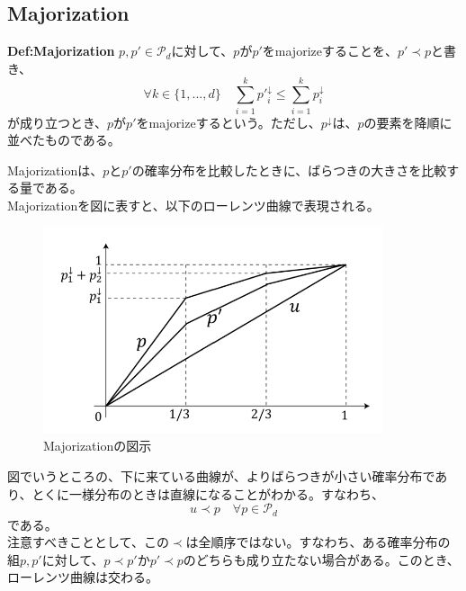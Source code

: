 \documentclass[a4paper,11pt]{jsarticle}
\numberwithin{equation}{section}
\begin{document}
\subsection{Majorization}
\begin{itembox}[l]{\textbf{Def:Majorization}}
    $p,p' \in \mathcal{P}_d$に対して、$p$が$p'$をmajorizeすることを、$p' \prec p$と書き、
    \begin{equation}
        \forall k \in \{1,...,d\} \quad \sum_{i=1}^{k}{p'}_i^{\downarrow} \leq \sum_{i=1}^{k}p_i^{\downarrow}
    \end{equation}
    が成り立つとき、$p$が$p'$をmajorizeするという。ただし、$p^{\downarrow}$は、$p$の要素を降順に並べたものである。
\end{itembox}
Majorizationは、$p$と$p'$の確率分布を比較したときに、ばらつきの大きさを比較する量である。\\
Majorizationを図に表すと、以下のローレンツ曲線で表現される。\\
\begin{figure}[H]
    \begin{center}
    \includegraphics[width=100mm]{image1.png}
    \end{center}
    \caption{Majorizationの図示}
    \label{fig:one}
\end{figure}
図でいうところの、下に来ている曲線が、よりばらつきが小さい確率分布であり、とくに一様分布のときは直線になることがわかる。すなわち、
\begin{equation}
    u \prec p \quad \forall p \in \mathcal{P}_d
\end{equation}
である。\\
注意すべきこととして、この$\prec$は全順序ではない。すなわち、ある確率分布の組$p,p'$に対して、$p \prec p'$か$p' \prec p$のどちらも成り立たない場合がある。このとき、ローレンツ曲線は交わる。\\
\end{document}
